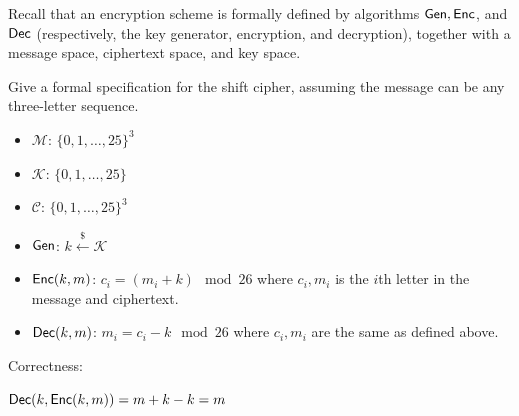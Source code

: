 \documentclass[12pt, letterpaper]{article}
\newcommand{\skcgen}{{\sf Gen}} \newcommand{\skcenc}{{\sf Enc}}
\newcommand{\skcdec}{{\sf Dec}}
\begin{document}
\color{\TextColor}
\pagecolor{\colormode}
\setlength{\parindent}{0pt}
\pagestyle{fancy}
\fancyhf{}

\begin{problem}{}
    Recall that an encryption scheme is formally
  defined by algorithms $\skcgen, \skcenc$, and $\skcdec$
  (respectively, the key generator, encryption, and decryption),
  together with a message space, ciphertext space, and key space.  
\end{problem}
\begin{subproblem}{}
    Give a formal specification for the shift cipher, assuming the message can be any three-letter sequence.
\end{subproblem}
\begin{solution}
    \begin{itemize}
        \item $\mathcal{M}$: $\{0,1,\dots,25\}^3$
        \item $\mathcal{K}$: $\{0,1,\dots,25\}$
        \item $\mathcal{C}$: $\{0,1,\dots,25\}^3$
        \item $\skcgen$: $k \overset{\$}{\leftarrow} \mathcal{K}$
        \item $\skcenc(k,m)$: $c_i = (m_i+k) \mod 26$ where $c_i,m_i$ is the $i$th letter in the message and ciphertext.
        \item $\skcdec(k,m)$: $m_i = c_i-k \mod 26$ where $c_i,m_i$ are the same as defined above.
    \end{itemize}
    Correctness:

    $\skcdec(k,\skcenc(k,m))=m+k-k=m$
\end{solution}
\end{document}
